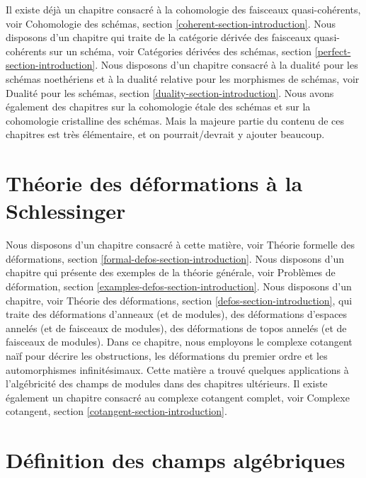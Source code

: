 \noindent
Il existe déjà un chapitre consacré à la cohomologie des faisceaux quasi-cohérents, voir
Cohomologie des schémas, section \ref{coherent-section-introduction}.
Nous disposons d'un chapitre qui traite de la catégorie dérivée des
faisceaux quasi-cohérents sur un schéma, voir
Catégories dérivées des schémas, section \ref{perfect-section-introduction}.
Nous disposons d'un chapitre consacré à la dualité pour les schémas noethériens
et à la dualité relative pour les morphismes de schémas, voir
Dualité pour les schémas, section \ref{duality-section-introduction}.
Nous avons également des chapitres sur la cohomologie \'etale des schémas et sur la
cohomologie cristalline des schémas. Mais la majeure partie du contenu de ces
chapitres est très élémentaire, et on pourrait/devrait y ajouter beaucoup.


\section{Théorie des déformations \`a la Schlessinger}
\label{section-deformation-schlessinger}

\noindent
Nous disposons d'un chapitre consacré à cette matière, voir
Théorie formelle des déformations, section \ref{formal-defos-section-introduction}.
Nous disposons d'un chapitre qui présente des exemples de la théorie générale, voir
Problèmes de déformation, section \ref{examples-defos-section-introduction}.
Nous disposons d'un chapitre, voir
Théorie des déformations, section \ref{defos-section-introduction},
qui traite des déformations d'anneaux (et de modules),
des déformations d'espaces annelés (et de faisceaux de modules),
des déformations de topos annelés (et de faisceaux de modules).
Dans ce chapitre, nous employons le complexe cotangent naïf
pour décrire les obstructions, les déformations du premier ordre et
les automorphismes infinitésimaux. Cette matière a trouvé quelques
applications à l'algébricité des champs de modules dans des chapitres ultérieurs.
Il existe également un chapitre consacré au complexe cotangent complet, voir
Complexe cotangent, section \ref{cotangent-section-introduction}.


\section{Définition des champs algébriques}
\label{section-definition-algebraic-stacks}

